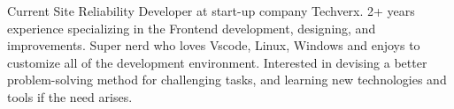

\begin{cvparagraph}

Current Site Reliability Developer at start-up company Techverx. 2+ years experience specializing in the Frontend development, designing, and improvements. Super nerd who loves Vscode, Linux, Windows and enjoys to customize all of the development environment. Interested in devising a better problem-solving method for challenging tasks, and learning new technologies and tools if the need arises.
\end{cvparagraph}
